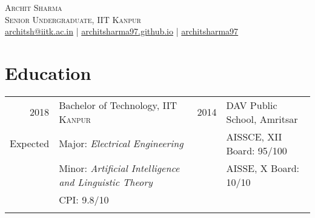 \documentclass[a4paper,10pt]{article}
\begin{document}

\pagestyle{empty} %


\par{\centering
		{\hspace{-2mm}\Huge \textsc{Archit Sharma}
	}\\\large \textsc{Senior Undergraduate, IIT Kanpur}\\\normalsize \Letter\hspace{1mm}\href{mailto:architsh@iitk.ac.in}{architsh@iitk.ac.in} | \Mundus\hspace{1mm}\href{https://architsharma97.github.io/}{ architsharma97.github.io} | \faGithub \hspace{0mm} \href{https://github.com/architsharma97/}{architsharma97} \par}
	
\section{Education}
\begin{tabular}{rlrl}	
\textsc{2018} & \large Bachelor of Technology, \textsc{IIT Kanpur} & \textsc{2014} & \large DAV Public School, Amritsar \\
Expected & {Major}: \textit{Electrical Engineering} & & AISSCE, XII Board: 95/100\\
         & {Minor}: \textit{Artificial Intelligence and Linguistic Theory}& & AISSE, X Board: 10/10\\ 
         & {CPI}: \textsc{9.8/10} \\
         & \\
\end{tabular}
\end{document}
